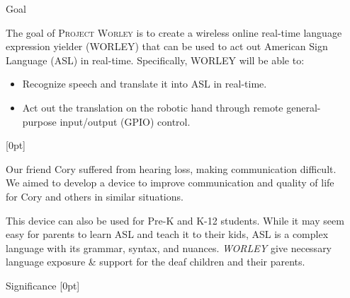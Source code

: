 \documentclass[final, 20pt]{beamer}
\newlength{\colwidth}
\begin{document}
\begin{frame}[t]
\begin{columns}[t]
\begin{column}{\colwidth}
    \end{column}

    \separatorcolumn

    \begin{column}{\colwidth}
      \begin{block}{Goal}

        The goal of \textsc{Project Worley} is to create a wireless online real-time language expression yielder (WORLEY) that can be used to act out American Sign Language (ASL) in real-time. Specifically, WORLEY will be able to:

        \begin{itemize}
          \item Recognize speech and translate it into ASL in real-time.
          \item Act out the translation on the robotic hand through remote general-purpose input/output (GPIO) control.
        \end{itemize}

        [0pt]

        Our friend Cory suffered from hearing loss, making communication difficult. We aimed to develop a device to improve communication and quality of life for Cory and others in similar situations.

        This device can also be used for Pre-K and K-12 students.  While it may seem easy for parents to learn ASL and teach it to their kids, ASL is a complex language with its grammar, syntax, and nuances. \emph{WORLEY} give necessary language exposure \& support for the deaf children and their parents.
      \end{block}

      \begin{block}{Significance}
        [0pt]


\end{block}
\end{column}
\end{columns}
\end{frame}
\end{document}
